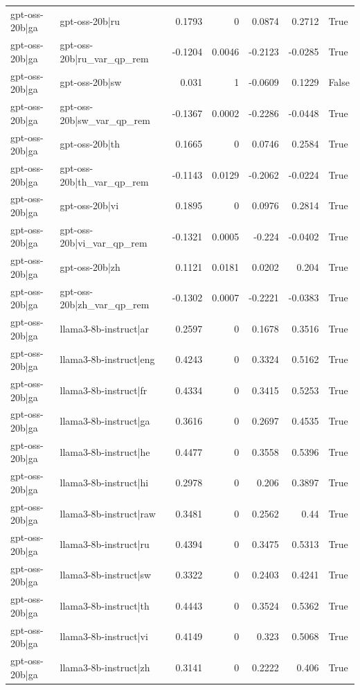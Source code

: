 \begin{table}
\begin{tabular}{l l r r r r l}
gpt-oss-20b|ga & gpt-oss-20b|ru & 0.1793 & 0 & 0.0874 & 0.2712 & True \\
gpt-oss-20b|ga & gpt-oss-20b|ru_var_qp_rem & -0.1204 & 0.0046 & -0.2123 & -0.0285 & True \\
gpt-oss-20b|ga & gpt-oss-20b|sw & 0.031 & 1 & -0.0609 & 0.1229 & False \\
gpt-oss-20b|ga & gpt-oss-20b|sw_var_qp_rem & -0.1367 & 0.0002 & -0.2286 & -0.0448 & True \\
gpt-oss-20b|ga & gpt-oss-20b|th & 0.1665 & 0 & 0.0746 & 0.2584 & True \\
gpt-oss-20b|ga & gpt-oss-20b|th_var_qp_rem & -0.1143 & 0.0129 & -0.2062 & -0.0224 & True \\
gpt-oss-20b|ga & gpt-oss-20b|vi & 0.1895 & 0 & 0.0976 & 0.2814 & True \\
gpt-oss-20b|ga & gpt-oss-20b|vi_var_qp_rem & -0.1321 & 0.0005 & -0.224 & -0.0402 & True \\
gpt-oss-20b|ga & gpt-oss-20b|zh & 0.1121 & 0.0181 & 0.0202 & 0.204 & True \\
gpt-oss-20b|ga & gpt-oss-20b|zh_var_qp_rem & -0.1302 & 0.0007 & -0.2221 & -0.0383 & True \\
gpt-oss-20b|ga & llama3-8b-instruct|ar & 0.2597 & 0 & 0.1678 & 0.3516 & True \\
gpt-oss-20b|ga & llama3-8b-instruct|eng & 0.4243 & 0 & 0.3324 & 0.5162 & True \\
gpt-oss-20b|ga & llama3-8b-instruct|fr & 0.4334 & 0 & 0.3415 & 0.5253 & True \\
gpt-oss-20b|ga & llama3-8b-instruct|ga & 0.3616 & 0 & 0.2697 & 0.4535 & True \\
gpt-oss-20b|ga & llama3-8b-instruct|he & 0.4477 & 0 & 0.3558 & 0.5396 & True \\
gpt-oss-20b|ga & llama3-8b-instruct|hi & 0.2978 & 0 & 0.206 & 0.3897 & True \\
gpt-oss-20b|ga & llama3-8b-instruct|raw & 0.3481 & 0 & 0.2562 & 0.44 & True \\
gpt-oss-20b|ga & llama3-8b-instruct|ru & 0.4394 & 0 & 0.3475 & 0.5313 & True \\
gpt-oss-20b|ga & llama3-8b-instruct|sw & 0.3322 & 0 & 0.2403 & 0.4241 & True \\
gpt-oss-20b|ga & llama3-8b-instruct|th & 0.4443 & 0 & 0.3524 & 0.5362 & True \\
gpt-oss-20b|ga & llama3-8b-instruct|vi & 0.4149 & 0 & 0.323 & 0.5068 & True \\
gpt-oss-20b|ga & llama3-8b-instruct|zh & 0.3141 & 0 & 0.2222 & 0.406 & True \\

\end{tabular}
\end{table}
